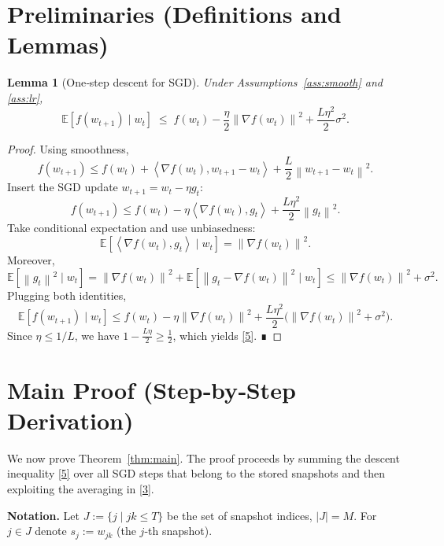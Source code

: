 \documentclass{article}
\newtheorem{lemma}{Lemma}
\newcommand{\E}{\mathbb{E}}
\newcommand{\norm}[1]{\left\|#1\right\|}
\newcommand{\ip}[2]{\left\langle #1,#2\right\rangle}
\begin{document}
\section*{Preliminaries (Definitions and Lemmas)}
\begin{lemma}[One‑step descent for SGD]\label{lem:descent}
Under Assumptions~\ref{ass:smooth} and \ref{ass:lr},
\[
\E\!\left[f(w_{t+1})\mid w_t\right]
\;\le\;
f(w_t)-\frac{\eta}{2}\norm{\nabla f(w_t)}^2
+\frac{L\eta^2}{2}\sigma^2 .
\tag{5}
\]
\end{lemma}
\begin{proof}
Using smoothness,
\[
f(w_{t+1})\le f(w_t)+\ip{\nabla f(w_t)}{w_{t+1}-w_t}
+\frac{L}{2}\norm{w_{t+1}-w_t}^2 .
\]
Insert the SGD update $w_{t+1}=w_t-\eta g_t$:
\[
f(w_{t+1})\le f(w_t)-\eta\ip{\nabla f(w_t)}{g_t}
+\frac{L\eta^2}{2}\norm{g_t}^2 .
\]
Take conditional expectation and use unbiasedness:
\[
\E\!\left[\ip{\nabla f(w_t)}{g_t}\mid w_t\right]
=\norm{\nabla f(w_t)}^2 .
\]
Moreover,
\[
\E\!\left[\norm{g_t}^2\mid w_t\right]
= \norm{\nabla f(w_t)}^2+\E\!\left[\norm{g_t-\nabla f(w_t)}^2\mid w_t\right]
\le \norm{\nabla f(w_t)}^2+\sigma^2 .
\]
Plugging both identities,
\[
\E\!\left[f(w_{t+1})\mid w_t\right]
\le f(w_t)-\eta\norm{\nabla f(w_t)}^2
+\frac{L\eta^2}{2}\big(\norm{\nabla f(w_t)}^2+\sigma^2\big).
\]
Since $\eta\le 1/L$, we have $1-\frac{L\eta}{2}\ge \frac12$, which yields \eqref{5}. ∎
\end{proof}

\section*{Main Proof (Step‑by‑Step Derivation)}
We now prove Theorem~\ref{thm:main}. The proof proceeds by summing the descent inequality \eqref{5} over all SGD steps that belong to the stored snapshots and then exploiting the averaging in \eqref{3}.

\noindent\textbf{Notation.} Let $J:=\{j\mid jk\le T\}$ be the set of snapshot indices, $|J|=M$. For $j\in J$ denote $s_j:=w_{jk}$ (the $j$‑th snapshot).  
\end{document}
